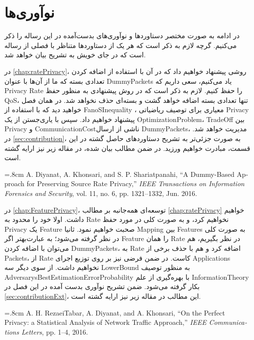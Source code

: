 \section{نوآوری‌ها}
\label{sec:contributionIntr}
در ادامه به صورت مختصر دستاوردها و نوآوری‌های بدست‌آمده در این رساله را ذکر می‌کنیم. گرچه لازم به ذکر است که هر یک از دستاوردها  متناظر با فصلی از رساله است که در جای خویش به تشریح بیان خواهد شد. 
\begin{itemize}
\sci
در
\autoref{chap:ratePrivacy}،
روشی پیشنهاد خواهیم داد که در آن با استفاده از اضافه کردن تعدادی بسته که ما از آن‌ها با عنوان
 \glspl{DummyPacket}
یاد می‌کنیم، سعی داریم که 
\gls{Privacy} \gls{Rate}
را حفظ کنیم. لازم به ذکر است که در روش پیشنهادی به منظور حفظ
\gls{QoS}،
تنها تعدادی بسته اضافه خواهد گشت و بسته‌ای حذف نخواهد شد. در همان فصل خواهید دید که با استفاده از 
\gls{FanoSInequality} \cite[قضیه $2.10.1$]{cover2006elements}،
معیاری برای توصیف ریاضیاتی
\gls{Privacy}
پیشنهاد خواهیم داد. سپس با یاری‌جستن از یک 
\gls{OptimizationProblem}، \gls{TradeOff} بین \gls{Privacy} و \gls{CommunicationCost}‌ناشی از ارسال
 \glspl{DummyPacket}،
مدیریت خواهد شد. در 
\autoref{sec:contribution}،
به صورت جزئی‌تر به تشریح دستاوردهای حاصل گشته در این قسمت، مبادرت خواهیم ورزید. در ضمن مطالب بیان شده، در مقاله زیر نیز ارایه گشته است. 
\begin{latin}
\baselineskip=.8cm
A. Diyanat, A. Khonsari, and S. P. Shariatpanahi, “A Dummy-Based Approach for Preserving Source Rate Privacy,” \textit{IEEE Transactions on Information Forensics and Security}, vol. 11, no. 6, pp. 1321–1332, Jun. 2016.
\end{latin}
\sci
در
\autoref{chap:FeaturePrivacy}،
توسعه‌ای همه‌جانبه بر مطالب
\autoref{chap:ratePrivacy}
خواهیم داشت. اولا خود را محدود به \gls{Rate} نخواهیم کرد، و به صورت کلی در مورد حفظ 
\gls{Privacy} یک \gls{Feature}
صحبت خواهیم نمود.  ثانیا 
\gls{Mapping}
بین 
\glspl{Feature}
به صورت کلی در نظر گرفته می‌شود؛ به عبارت‌بهتر اگر
\gls{Feature} را همان \gls{Rate}
در نظر بگیریم، هم می‌توان با اضافه کردن
\glspl{DummyPacket}، به \gls{Rate}
اضافه کرد و هم با حذف برخی از 
\glspl{Packet}، از \gls{Rate}
کاست.  در ضمن فرضی نیز بر روی توزیع اجرای 
\glspl{Application}
نخواهیم داشت. از سوی دیگر سه 
\gls{LowerBound} به منظور توصیف \gls{AdversarysBestEstimationErrorProbability}
با بهره‌گیری از علم
\gls{InformationTheory}
بکار گرفته می‌شود. ضمن تشریح نوآوری بدست آمده در این فصل در 
\autoref{sec:contributionExt}،
این مطالب در مقاله زیر نیز ارایه گشته است. 
\begin{latin}
\baselineskip=.8cm
A. H. RezaeiTabar, A. Diyanat, and A. Khonsari, “On the Perfect Privacy: a Statistical Analysis of Network Traffic Approach,” \textit{IEEE Communications Letters}, pp. 1–4, 2016.

\end{latin}
\end{itemize}
